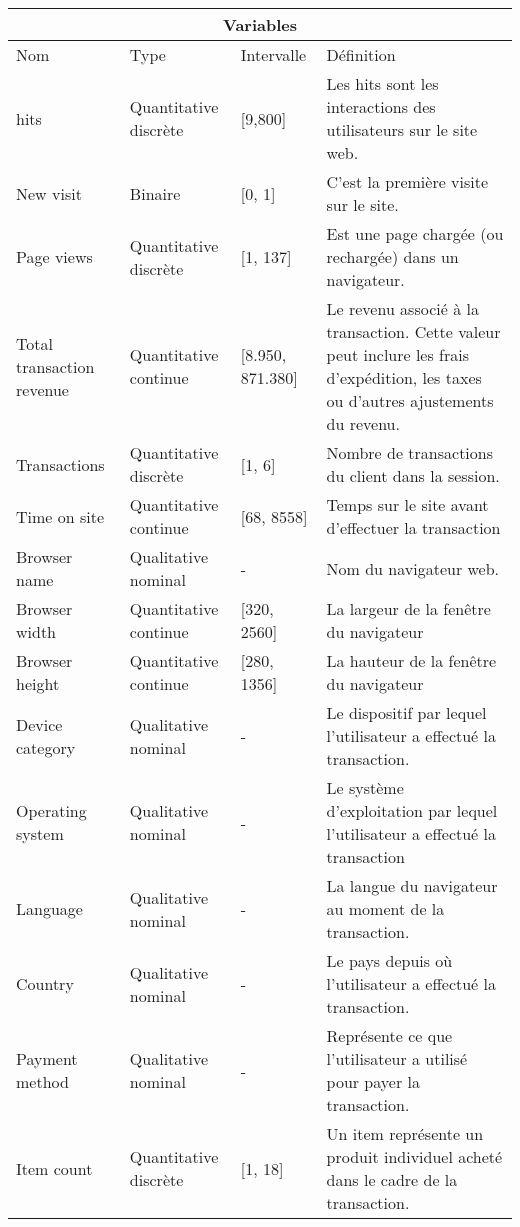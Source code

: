\begin{center}
\begin{longtable}{ |p{3cm}||p{3cm}|p{2cm}|p{5cm}|  }
 \hline
 \multicolumn{4}{|c|}{Variables} \\
 \hline
 Nom & Type &Intervalle&Définition\\
 \hline
 hits   & Quantitative discrète  &[9,800]&  Les hits sont les interactions des utilisateurs sur le site web.\\
New visit &   Binaire   & [0, 1]   & C'est la première visite sur le site.\\
Page views&   Quantitative discrète  & [1, 137]   &Est une page chargée (ou rechargée) dans un navigateur.\\
Total transaction revenue & Quantitative continue  &[8.950, 871.380]&  Le revenu associé à la transaction. Cette valeur peut inclure les frais d'expédition, les taxes ou d'autres ajustements du revenu.\\
Transactions    &Quantitative discrète  & [1, 6] &  Nombre de transactions du client dans la session.\\
Time on site&   Quantitative continue  & [68, 8558]& Temps sur le site avant d'effectuer la transaction \\
 Browser name& Qualitative nominal  & -   & Nom du navigateur web.\\
 Browser width& Quantitative continue  & [320, 2560]& La largeur de la fenêtre du navigateur \\
 Browser height& Quantitative continue  & [280, 1356]& La hauteur de la fenêtre du navigateur\\
 Device category& Qualitative nominal   & -&Le dispositif par lequel l'utilisateur a effectué la transaction.\\
 Operating system& Qualitative nominal  & -&Le système d'exploitation par lequel l'utilisateur a effectué la transaction\\
 Language& Qualitative nominal  & -& La langue du navigateur au moment de la transaction.\\
 Country& Qualitative nominal   & -& Le pays depuis où l'utilisateur a effectué la transaction.\\
 Payment method& Qualitative nominal   & -&  Représente  ce que l'utilisateur a utilisé pour payer la transaction.\\
 Item count& Quantitative discrète  & [1, 18]& Un item représente un produit individuel acheté dans le cadre de la transaction. \\
 \hline
\end{longtable}
\end{center}

